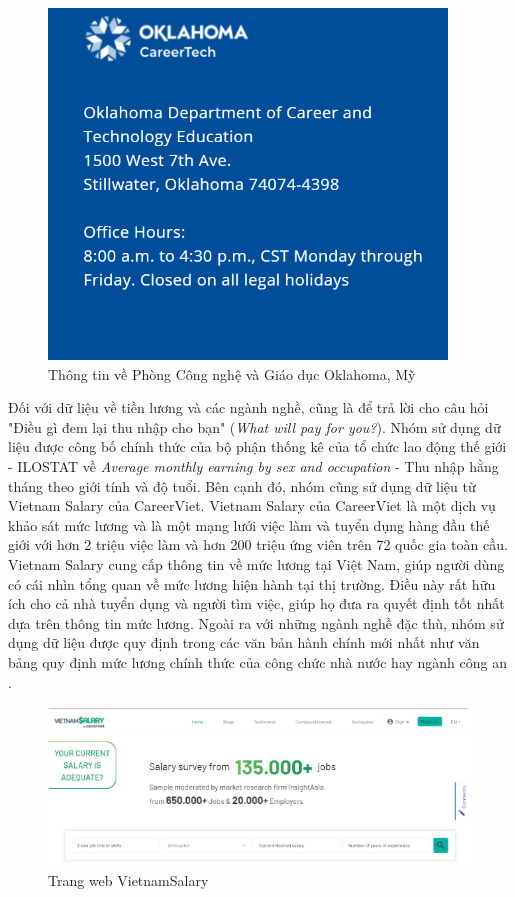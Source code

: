 \begin{figure}[H]
    \centering
    \includegraphics[width=0.5\linewidth]{images/oklahomaInfo.png}
    \vspace{0.5cm}
    \caption{Thông tin về Phòng Công nghệ và Giáo dục Oklahoma, Mỹ}
\end{figure}

Đối với dữ liệu về tiền lương và các ngành nghề, cũng là để trả lời cho câu hỏi "Điều gì đem lại thu nhập cho bạn" (\textit{What will pay for you?}). Nhóm sử dụng dữ liệu được công bố chính thức của bộ phận thống kê của tổ chức lao động thế giới - ILOSTAT về \textit{Average monthly earning by sex and occupation} - Thu nhập hằng tháng theo giới tính và độ tuổi. Bên cạnh đó, nhóm cũng sử dụng dữ liệu từ Vietnam Salary của CareerViet. Vietnam Salary của CareerViet là một dịch vụ khảo sát mức lương và là một mạng lưới việc làm và tuyển dụng hàng đầu thế giới với hơn 2 triệu việc làm và hơn 200 triệu ứng viên trên 72 quốc gia toàn cầu. Vietnam Salary cung cấp thông tin về mức lương tại Việt Nam, giúp người dùng có cái nhìn tổng quan về mức lương hiện hành tại thị trường. Điều này rất hữu ích cho cả nhà tuyển dụng và người tìm việc, giúp họ đưa ra quyết định tốt nhất dựa trên thông tin mức lương. Ngoài ra với những ngành nghề đặc thù, nhóm sử dụng dữ liệu được quy định trong các văn bản hành chính mới nhất như văn bảng quy định mức lương chính thức của công chức nhà nước hay ngành công an \cite{thuvienphapluat} \cite{tuoitre} \cite{hocmai} \cite{umt} \cite{topcv} \cite{xaydungchinhsach}.

\begin{figure}[H]
    \centering
    \includegraphics[width=0.6\linewidth]{images/VietnamSalary.png}
    \vspace{0.6cm}
    \caption{Trang web VietnamSalary}
\end{figure}

